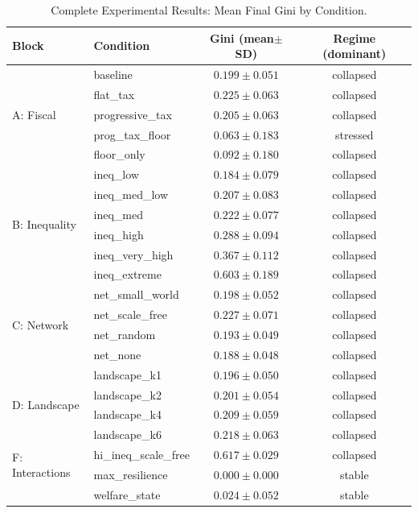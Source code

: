 \documentclass[12pt, letterpaper]{article}
\begin{document}
\begin{table}[h]
\centering
\caption{Complete Experimental Results: Mean Final Gini by Condition.}
\label{tab:allblocks}
\small
\begin{tabular}{llcc}
\toprule
Block & Condition & Gini (mean$\pm$SD) & Regime (dominant) \\
\midrule
\multirow{5}{*}{A: Fiscal}
  & baseline          & $0.199 \pm 0.051$ & collapsed \\
  & flat\_tax         & $0.225 \pm 0.063$ & collapsed \\
  & progressive\_tax  & $0.205 \pm 0.063$ & collapsed \\
  & prog\_tax\_floor  & $0.063 \pm 0.183$ & stressed \\
  & floor\_only       & $0.092 \pm 0.180$ & collapsed \\
\midrule
\multirow{6}{*}{B: Inequality}
  & ineq\_low         & $0.184 \pm 0.079$ & collapsed \\
  & ineq\_med\_low    & $0.207 \pm 0.083$ & collapsed \\
  & ineq\_med         & $0.222 \pm 0.077$ & collapsed \\
  & ineq\_high        & $0.288 \pm 0.094$ & collapsed \\
  & ineq\_very\_high  & $0.367 \pm 0.112$ & collapsed \\
  & ineq\_extreme     & $0.603 \pm 0.189$ & collapsed \\
\midrule
\multirow{4}{*}{C: Network}
  & net\_small\_world & $0.198 \pm 0.052$ & collapsed \\
  & net\_scale\_free  & $0.227 \pm 0.071$ & collapsed \\
  & net\_random       & $0.193 \pm 0.049$ & collapsed \\
  & net\_none         & $0.188 \pm 0.048$ & collapsed \\
\midrule
\multirow{4}{*}{D: Landscape}
  & landscape\_k1     & $0.196 \pm 0.050$ & collapsed \\
  & landscape\_k2     & $0.201 \pm 0.054$ & collapsed \\
  & landscape\_k4     & $0.209 \pm 0.059$ & collapsed \\
  & landscape\_k6     & $0.218 \pm 0.063$ & collapsed \\
\midrule
\multirow{2}{*}{F: Interactions}
  & hi\_ineq\_scale\_free & $0.617 \pm 0.029$ & collapsed \\
  & max\_resilience       & $0.000 \pm 0.000$ & stable \\
  & welfare\_state        & $0.024 \pm 0.052$ & stable \\

\end{tabular}
\end{table}
\end{document}
